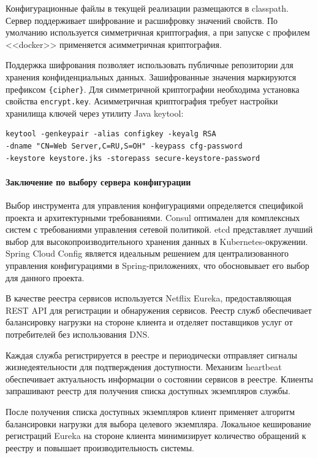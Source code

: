 Конфигурационные файлы в текущей реализации размещаются в classpath.
Сервер поддерживает шифрование и расшифровку значений свойств. По умолчанию используется симметричная криптография, а при запуске с профилем <<docker>> применяется асимметричная криптография.

Поддержка шифрования позволяет использовать публичные репозитории для хранения конфиденциальных данных.
Зашифрованные значения маркируются префиксом \texttt{\{cipher\}}. Для симметричной криптографии необходима установка свойства \texttt{encrypt.key}.
Асимметричная криптография требует настройки хранилища ключей через утилиту Java keytool:

\begin{lstlisting}
keytool -genkeypair -alias configkey -keyalg RSA
-dname "CN=Web Server,C=RU,S=OH" -keypass cfg-password
-keystore keystore.jks -storepass secure-keystore-password
\end{lstlisting}

\paragraph{Заключение по выбору сервера конфигурации}

Выбор инструмента для управления конфигурациями определяется спецификой проекта и архитектурными требованиями. Consul оптимален для комплексных систем с требованиями управления сетевой политикой. etcd представляет лучший выбор для высокопроизводительного хранения данных в Kubernetes-окружении. Spring Cloud Config является идеальным решением для централизованного управления конфигурациями в Spring-приложениях, что обосновывает его выбор для данного проекта.


В качестве реестра сервисов используется Netflix Eureka, предоставляющая REST API для регистрации и обнаружения сервисов.
Реестр служб обеспечивает балансировку нагрузки на стороне клиента и отделяет поставщиков услуг от потребителей без использования DNS.

Каждая служба регистрируется в реестре и периодически отправляет сигналы жизнедеятельности для подтверждения доступности. Механизм heartbeat обеспечивает актуальность информации о состоянии сервисов в реестре.
Клиенты запрашивают реестр для получения списка доступных экземпляров службы.

После получения списка доступных экземпляров клиент применяет алгоритм балансировки нагрузки для выбора целевого экземпляра. Локальное кеширование регистраций Eureka на стороне клиента минимизирует количество обращений к реестру и повышает производительность системы.

